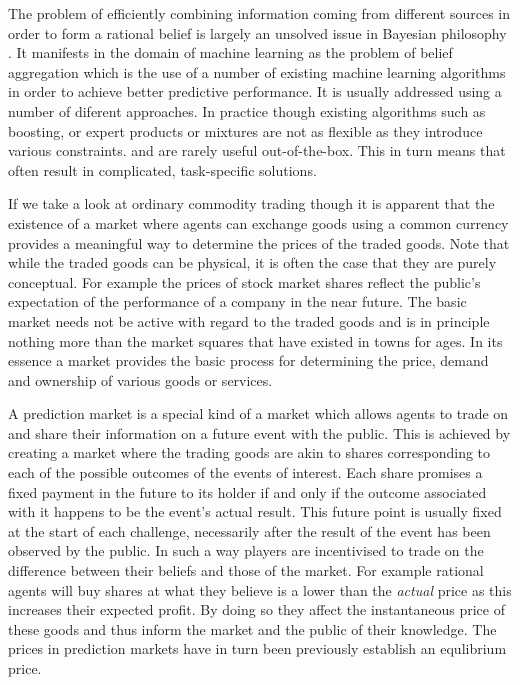 \documentclass[bsc,frontabs,twoside,singlespacing,parskip,deptreport]{infthesis}     %
\begin{document}
The problem of efficiently combining information coming from different sources in order to form a rational belief is largely an unsolved issue in Bayesian philosophy \cite{greene_collective_2010}. It manifests in the domain of machine learning as the problem of belief aggregation which is the use of a number of existing machine learning algorithms in order to achieve better predictive performance. It is usually addressed using a number of diferent approaches. In practice though existing algorithms such as boosting, or expert products or mixtures are not as flexible as they introduce various constraints. and are rarely useful out-of-the-box. This in turn means that often result in complicated, task-specific solutions.

	If we take a look at ordinary commodity trading though it is apparent that the existence of a market where agents can exchange goods using a common currency provides a meaningful way to determine the prices of the traded goods. Note that while the traded goods can be physical, it is often the case that they are purely conceptual. For example the prices of stock market shares reflect the public's expectation of the performance of a company in the near future. The basic market needs not be active with regard to the traded goods and is in principle nothing more than the market squares that have existed in towns for ages. In its essence a market provides the basic process for determining the price, demand and ownership of various goods or services. 

	A prediction market is a special kind of a market which allows agents to trade on and share their information on a future event with the public. This is achieved by creating a market where the trading goods are akin to shares corresponding to each of the possible outcomes of the events of interest. Each share promises a fixed payment in the future to its holder if and only if the outcome associated with it happens to be the event's actual result. This future point is usually fixed at the start of each challenge, necessarily after the result of the event has been observed by the public. In such a way players are incentivised to trade on the difference between their beliefs and those of the market. For example rational agents will buy shares at what they believe is a lower than the {\em actual} price as this increases their expected profit. By doing so they affect the instantaneous price of these goods and thus inform the market and the public of their knowledge. The prices in prediction markets have in turn been previously establish an equlibrium price. 
	
\end{document}
